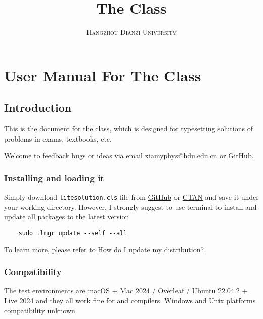 \documentclass[mtpro2]{litesolution}
\title{\sffamily The \pkg{LiteSolution} Class}
\subtitle{\sffamily\scshape Hangzhou Dianzi University}
\begin{document}
\maketitle[DarkSlateGray]

\chapter{User Manual For The  Class}

\section{Introduction}

This is the document for the  class, which is designed for typesetting solutions of problems in exams, textbooks, etc.

Welcome to feedback bugs or ideas via email \href{mailto:xiamyphys@hdu.edu.cn}{\ttfamily xiamyphys@hdu.edu.cn} or \href{https://github.com/xiamyphys/litesolution}{GitHub}.

\subsection{Installing  and loading it}

Simply download \verb|litesolution.cls| file from \href{https://github.com/xiamyphys/litesolution}{GitHub} or \href{https://ctan.org/pkg/litesolution}{CTAN} and save it under your working directory. However, I strongly suggest to use terminal to install and update all packages to the latest version

\begin{verbatim}
    sudo tlmgr update --self --all
\end{verbatim}

To learn more, please refer to \href{https://tex.stackexchange.com/questions/55437/how-do-i-update-my-tex-distribution}{How do I update my  distribution?}

\subsection{Compatibility}

The test environments are macOS + Mac 2024 / Overleaf / Ubuntu 22.04.2 +  Live 2024 and they all work fine for  and  compilers. Windows and Unix platforms compatibility unknown.
\end{document}
